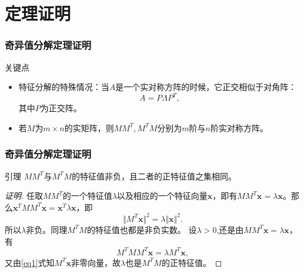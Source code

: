 
\section{定理证明} 


\begin{frame}
\frametitle{奇异值分解定理证明}

\begin{block}{关键点}
\begin{itemize}
\item<2-> 特征分解的特殊情况：当$A$是一个实对称方阵的时候，它正交相似于对角阵：
$$A = P\Lambda P^T,$$
其中$P$为正交阵。
\vspace{1em}
\item<3-> 若$M$为$m\times n$的实矩阵，则$MM^T, M^TM$分别为$m$阶与$n$阶实对称方阵。
\end{itemize}
\end{block}

\end{frame}



\begin{frame}
\frametitle{奇异值分解定理证明}

\begin{block}{引理}
\centering
$MM^T$与$M^TM$的特征值非负，且二者的正特征值之集相同。
\end{block}

\pause

\begin{proof}[证明\nopunct]
任取$MM^T$的一个特征值$\lambda$以及相应的一个特征向量$\mathbf{x}$，即有$MM^T\mathbf{x} = \lambda\mathbf{x}$。那么$\mathbf{x}^TMM^T\mathbf{x} = \mathbf{x}^T\lambda\mathbf{x}$，即
\begin{equation}
\label{eq1}
\Vert M^T\mathbf{x} \Vert^2 = \lambda \Vert \mathbf{x} \Vert^2.
\end{equation}
所以$\lambda$非负。同理$M^TM$的特征值也都是非负实数。\newline\pause
设$\lambda > 0$,还是由$MM^T\mathbf{x} = \lambda\mathbf{x}$，有
\begin{equation}
\label{eq2}
M^TMM^T\mathbf{x} = \lambda M^T\mathbf{x},
\end{equation}
又由\eqref{eq1}式知$M^T\mathbf{x}$非零向量，故$\lambda$也是$M^TM$的正特征值。
\end{proof}

\end{frame}

